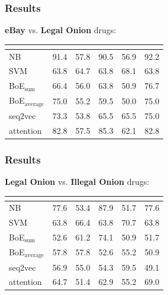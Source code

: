 \documentclass[t,xcolor={svgnames,table}]{beamer}
\begin{document}
\begin{frame}
	\frametitle{Results}
	
	\textbf{\color{yellow} eBay} vs. \textbf{\color{green} Legal Onion} drugs:
	
	\begin{center}
		\setlength{\tabcolsep}{8pt}
		\begin{tabular}{l *{5}{R}}
		& 
		& 
		& 
		& 
		& \\
		\hline
		NB & 91.4 & 57.8 & 90.5 & 56.9 & 92.2\\
		SVM & 63.8 & 64.7 & 63.8 & 68.1 & 63.8\\
		BoE$_\mathrm{sum}$ & 66.4 & 56.0 & 63.8 & 50.9 & 76.7\\
		BoE$_\mathrm{average}$ & 75.0 & 55.2 & 59.5 & 50.0 & 75.0\\
		seq2vec & 73.3 & 53.8 & 65.5 & 65.5 & 75.0\\
		attention & 82.8 & 57.5 & 85.3 & 62.1 & 82.8
		\end{tabular}
	\end{center}
\end{frame}

\begin{frame}
	\frametitle{Results}
	
	\textbf{\color{green} Legal Onion} vs. \textbf{\color{red} Illegal Onion} drugs:
	
	\begin{center}
		\setlength{\tabcolsep}{8pt}
		\begin{tabular}{l *{5}{R}}
		& 
		& 
		& 
		& 
		& \\
		\hline
		NB & 77.6 & 53.4 & 87.9 & 51.7 & 77.6\\
		SVM & 63.8 & 66.4 & 63.8 & 70.7 & 63.8\\
		BoE$_\mathrm{sum}$ & 52.6 & 61.2 & 74.1 & 50.9 & 51.7\\
		BoE$_\mathrm{average}$ & 57.8 & 57.8 & 52.6 & 55.2 & 50.9\\
		seq2vec & 56.9 & 55.0 & 54.3 & 59.5 & 49.1\\
		attention & 64.7 & 51.4 & 62.9 & 55.2 & 69.0
		\end{tabular}
	\end{center}
\end{frame}
\end{document}
